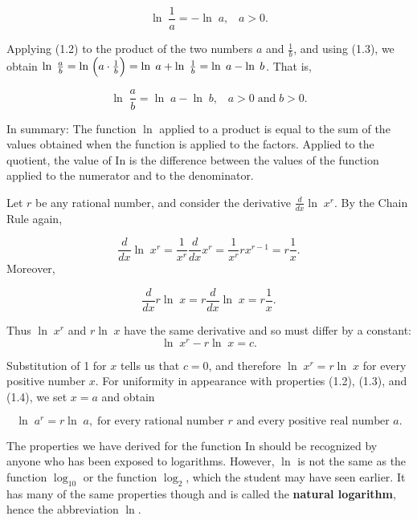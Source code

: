\begin{theorem}
$$
\ln\; \frac{1}{a} = - \ln\; a,  \;\;\;a > 0.
$$
\end{theorem}

Applying (1.2) to the product of the two numbers $a$ and $\frac{1}{b}$, and using (1.3), we obtain 
$\ln\; \frac{a}{b} = \ln\; \Bigl( a \cdot \frac{1}{b} \Bigr) = \ln\; a + \ln\; \frac{1}{b} 
= \ln\; a - \ln\; b$. That is,

\begin{theorem}
$$
\ln\;\frac{a}{b} = \ln\; a - \ln\; b,  \;\;\; a > 0 \; \mbox{and} \;b > 0.
$$
\end{theorem}

In summary: The function $\ln$ applied to a product is equal to the sum of the values obtained when the function is applied to the factors. Applied to the quotient, the value of In is the difference between the values of the function applied to the numerator and to the denominator.

Let $r$ be any rational number, and consider the derivative $\frac{d}{dx} \ln\; x^r$.
By the Chain Rule again, 

$$
\frac{d}{dx} \ln\; x^r = \frac{1}{x^r} \frac{d}{dx} x^r = \frac{1}{x^r} r x^{r-1} = r \frac{1}{x}. 
$$
\noindent Moreover, 

$$
\frac{d}{dx} r \ln\; x = r \frac{d}{dx} \ln\; x = r \frac{1}{x}.
$$

\noindent Thus $\ln\; x^r$ and $r \ln\; x$ have the same derivative and so must differ by a constant:
$$
\ln\; x^r - r \ln\; x = c.
$$

\noindent Substitution of 1 for $x$ tells us that $c = 0$, and therefore $\ln\; x^r = r \ln\; x$ for every positive number $x$. For uniformity in appearance with properties (1.2), (1.3), and (1.4), we set $x = a$ and obtain


\begin{theorem} %
$$
\ln\; a^r = r \ln\; a, \;\mbox{for every rational number $r$ and every positive real number $a$.}
$$
\end{theorem}

The properties we have derived for the function In should be recognized by anyone who has been exposed to logarithms. However, $\ln$ is not the same as the function $\log_{10}$ or the function $\log_{2}$, which the student may have seen earlier. It has many of the same properties though and is called the \textbf{natural logarithm}, hence the abbreviation $\ln$.

